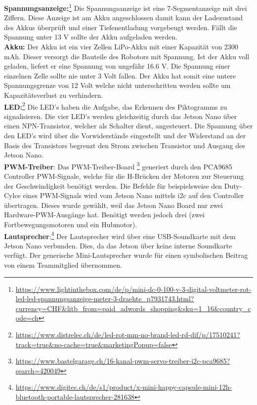 \textbf{Spannungsanzeige:}\footnote{\url{https://www.lightinthebox.com/de/p/mini-dc-0-100-v-3-digital-voltmeter-rot-led-led-spannungsanzeige-meter-3-draehte_p7931743.html?currency=CHF&litb_from=paid_adwords_shopping&sku=1_16&country_code=ch}} Die Spannungsanzeige ist eine 7-Segmentanzeige mit drei Ziffern. Diese Anzeige ist am Akku angeschlossen damit kann der Ladezustand des Akkus überprüft und einer Tiefenentladung vorgebeugt werden. Fällt die Spannung unter 13 V sollte der Akku aufgeladen werden.\\

\textbf{Akku:} Der Akku \cite{Akku-Modellbau} ist ein vier Zellen LiPo-Akku mit einer Kapazität von 2300 mAh. Dieser versorgt die Bauteile des Robotors mit Spannung. Ist der Akku voll geladen, liefert er eine Spannung von ungefähr 16.6 V. Die Spannung einer einzelnen Zelle sollte nie unter 3 Volt fallen. Der Akku hat somit eine untere Spannungsgrenze von 12 Volt welche nicht unterschritten werden sollte um Kapazitätsverlust zu verhindern.\\

\textbf{LED:}\footnote{\url{https://www.distrelec.ch/de/led-rot-mm-no-brand-led-rd-dif/p/17510241?track=true&no-cache=true&marketingPopup=false}} Die LED's haben die Aufgabe, das Erkennen des Piktogramms zu signalisieren. Die vier LED's werden gleichzeitig durch das Jetson Nano über einen NPN-Transistor, welcher als Schalter dient, angesteuert. Die Spannung über den LED's wird über die Vorwiderstände eingestellt und der Widerstand an der Basis des Transistors begrenzt den Strom zwischen Transistor und Ausgang des Jetson Nano.\\

\textbf{PWM-Treiber}: Das PWM-Treiber-Board \footnote{\url{https://www.bastelgarage.ch/16-kanal-pwm-servo-treiber-i2c-pca9685?search=420049}} generiert durch den PCA9685 Controller PWM-Signale, welche für die H-Brücken der Motoren zur Steuerung der Geschwindigkeit benötigt werden. Die Befehle für beispielsweise den Duty-Cylce eines PWM-Signals wird vom Jetson Nano mittels \acrshort{i2c} auf den Controller übertragen. Dieses wurde gewählt, weil das Jetson Nano Board nur zwei Hardware-PWM-Ausgänge hat. Benötigt werden jedoch drei (zwei Fortbewegungsmotoren und ein Hubmotor). \\

\textbf{Lautsprecher}:\footnote{\url{https://www.digitec.ch/de/s1/product/x-mini-happy-capsule-mini-12h-bluetooth-portable-lautsprecher-281638}} Der Lautsprecher wird über eine USB-Soundkarte mit dem Jetson Nano verbunden. Dies, da das Jetson über keine interne Soundkarte verfügt. Der generische Mini-Lautsprecher wurde für einen symbolischen Beitrag von einem Teammitglied übernommen.


